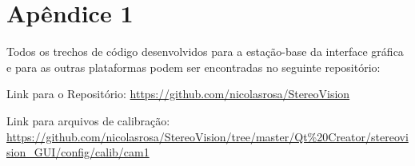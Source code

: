\chapter{Apêndice 1}
\label{Apendice1}

Todos os trechos de código desenvolvidos para a estação-base da interface gráfica e para as outras plataformas podem ser encontradas no seguinte repositório:

Link para o Repositório: \url{https://github.com/nicolasrosa/StereoVision}

Link para arquivos de calibração: \url{https://github.com/nicolasrosa/StereoVision/tree/master/Qt\%20Creator/stereovision_GUI/config/calib/cam1}